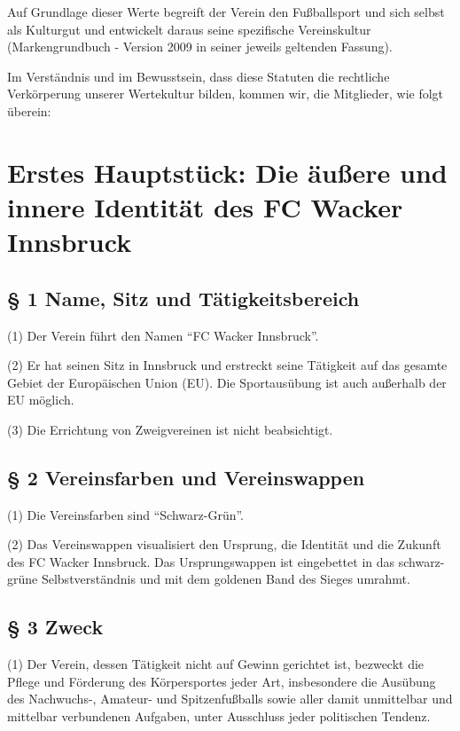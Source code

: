 \documentclass[10pt,a4paper]{article}
\begin{document}
Auf Grundlage dieser Werte begreift der Verein den Fußballsport und sich selbst als Kulturgut und entwickelt daraus seine spezifische Vereinskultur (Markengrundbuch - Version 2009 in seiner jeweils geltenden Fassung).

Im Verständnis und im Bewusstsein, dass diese Statuten die rechtliche Verkörperung unserer Wertekultur bilden, kommen wir, die Mitglieder, wie folgt überein:

\clearpage
\setlength{\parskip}{10pt}
\upshape

\section{Erstes Hauptstück: Die äußere und innere Identität des FC Wacker Innsbruck}

\subsection{§ 1
Name, Sitz und Tätigkeitsbereich}

(1)
Der Verein führt den Namen "`FC Wacker Innsbruck"'.

(2)
Er hat seinen Sitz in Innsbruck und erstreckt seine Tätigkeit auf das gesamte Gebiet der Europäischen Union (EU).
Die Sportausübung ist auch außerhalb der EU möglich.

(3)
Die Errichtung von Zweigvereinen ist nicht beabsichtigt.

\subsection{§ 2
Vereinsfarben und Vereinswappen}

(1)
Die Vereinsfarben sind "`Schwarz-Grün"'.

(2)
Das Vereinswappen visualisiert den Ursprung, die Identität und die Zukunft des FC Wacker Innsbruck.
Das Ursprungswappen ist eingebettet in das schwarz-grüne Selbstverständnis und mit dem goldenen Band des Sieges umrahmt.

\subsection{§ 3
Zweck}

(1)
Der Verein, dessen Tätigkeit nicht auf Gewinn gerichtet ist, bezweckt die Pflege und Förderung des Körpersportes jeder Art, insbesondere die Ausübung des Nachwuchs-, Amateur- und Spitzenfußballs sowie aller damit unmittelbar und mittelbar verbundenen Aufgaben, unter Ausschluss jeder politischen Tendenz.
\end{document}

